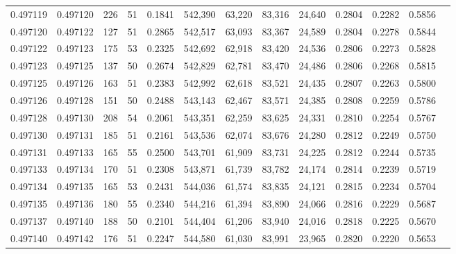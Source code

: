 \begin{tabular}{rrrrrrrrrrrrr}
0.497119 & 0.497120 &   226 &  51 &                                     0.1841 & 542,390 &  63,220 &  83,316 &  24,640 & 0.2804 & 0.2282 & 0.5856 \\
0.497120 & 0.497122 &   127 &  51 &                                     0.2865 & 542,517 &  63,093 &  83,367 &  24,589 & 0.2804 & 0.2278 & 0.5844 \\
0.497122 & 0.497123 &   175 &  53 &                                     0.2325 & 542,692 &  62,918 &  83,420 &  24,536 & 0.2806 & 0.2273 & 0.5828 \\
0.497123 & 0.497125 &   137 &  50 &                                     0.2674 & 542,829 &  62,781 &  83,470 &  24,486 & 0.2806 & 0.2268 & 0.5815 \\
0.497125 & 0.497126 &   163 &  51 &                                     0.2383 & 542,992 &  62,618 &  83,521 &  24,435 & 0.2807 & 0.2263 & 0.5800 \\
0.497126 & 0.497128 &   151 &  50 &                                     0.2488 & 543,143 &  62,467 &  83,571 &  24,385 & 0.2808 & 0.2259 & 0.5786 \\
0.497128 & 0.497130 &   208 &  54 &                                     0.2061 & 543,351 &  62,259 &  83,625 &  24,331 & 0.2810 & 0.2254 & 0.5767 \\
0.497130 & 0.497131 &   185 &  51 &                                     0.2161 & 543,536 &  62,074 &  83,676 &  24,280 & 0.2812 & 0.2249 & 0.5750 \\
0.497131 & 0.497133 &   165 &  55 &                                     0.2500 & 543,701 &  61,909 &  83,731 &  24,225 & 0.2812 & 0.2244 & 0.5735 \\
0.497133 & 0.497134 &   170 &  51 &                                     0.2308 & 543,871 &  61,739 &  83,782 &  24,174 & 0.2814 & 0.2239 & 0.5719 \\
0.497134 & 0.497135 &   165 &  53 &                                     0.2431 & 544,036 &  61,574 &  83,835 &  24,121 & 0.2815 & 0.2234 & 0.5704 \\
0.497135 & 0.497136 &   180 &  55 &                                     0.2340 & 544,216 &  61,394 &  83,890 &  24,066 & 0.2816 & 0.2229 & 0.5687 \\
0.497137 & 0.497140 &   188 &  50 &                                     0.2101 & 544,404 &  61,206 &  83,940 &  24,016 & 0.2818 & 0.2225 & 0.5670 \\
0.497140 & 0.497142 &   176 &  51 &                                     0.2247 & 544,580 &  61,030 &  83,991 &  23,965 & 0.2820 & 0.2220 & 0.5653 \\

\end{tabular}
